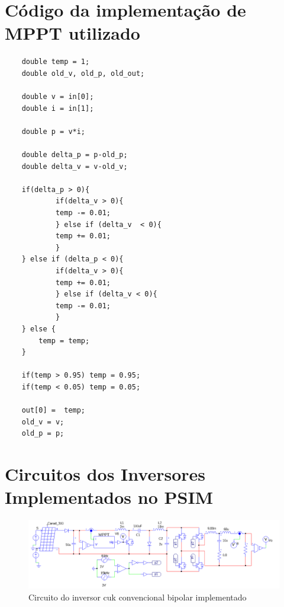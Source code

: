 \documentclass[
	12pt,				%
	openany,
	onseside,
	a4paper,			%
	english,			%
	french,				%
	spanish,			%
	brazil,				%
	]{abntex2}
\begin{document}


\begin{anexosenv}

	\partanexos
	\chapter{Código da implementação de MPPT utilizado}\label{anex:mppt_code}


	\begin{lstlisting}
	double temp = 1;
	double old_v, old_p, old_out;

	double v = in[0];
	double i = in[1];

	double p = v*i;

	double delta_p = p-old_p;
	double delta_v = v-old_v;

	if(delta_p > 0){
			if(delta_v > 0){
			temp -= 0.01; 
			} else if (delta_v  < 0){
			temp += 0.01;
			}
	} else if (delta_p < 0){
			if(delta_v > 0){
			temp += 0.01;
			} else if (delta_v < 0){
			temp -= 0.01; 
			}
	} else {
		temp = temp;
	}

	if(temp > 0.95) temp = 0.95;
	if(temp < 0.05) temp = 0.05;

	out[0] =  temp;
	old_v = v;
	old_p = p;

	\end{lstlisting}

	\chapter{Circuitos dos Inversores Implementados no PSIM} \label{anex:circ_images}

	\begin{figure}
		\centering
		\includegraphics[width=\linewidth]{comp_conv_circ_clean}
		\caption{Circuito do inversor cuk convencional bipolar implementado}	


\end{figure}
\end{anexosenv}
\end{document}
